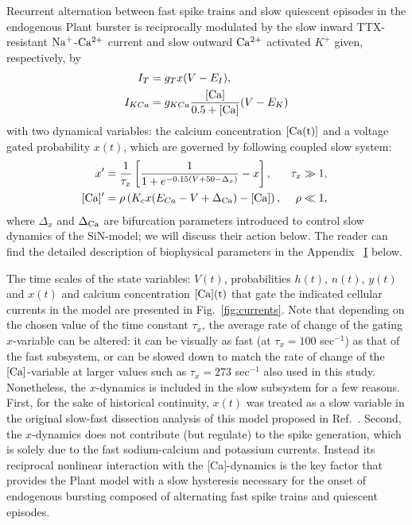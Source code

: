 \documentclass[nofootinbib,aip,amsmath,amssymb,reprint,twocolumn,10pt]{revtex4-2}
\begin{document}
Recurrent alternation between fast spike trains and slow quiescent episodes in the endogenous Plant burster is reciprocally modulated by the slow inward TTX-resistant $\rm Na^{+}$-$\rm Ca^{2+}$ current and slow outward $\rm Ca^{2+}$ activated $K^+$ given, respectively, by 
%
\begin{align} 
I_{T} &= g_{T} x (V-E_{I}), \label{eq:ttxcurrent} \\
I_{KCa} &= g_{KCa}\frac{[\rm Ca]}{0.5+[\rm Ca]}(V-E_{K}) \label{eq:cacurrent} 
\end{align}
with two dynamical variables: the calcium concentration $[\rm Ca(t)]$ and a voltage gated probability $x(t)$, which are governed by following coupled slow system:  
%
\begin{align}
x^\prime &= \frac{1}{\tau_x}\left [ \frac{1}{1+e^{-0.15(V+50- \Delta_{x})}}-x \right ], &\tau_x &\gg 1, \label{SlowSub1} ~\\
[\rm Ca]^\prime  &=  \rho \left ( K_{c} x (E_{Ca}-V + \Delta_{\rm Ca})-[\rm Ca] \right  ), &\rho &\ll 1,  \label{SlowSub2}  
\end{align}
where $\Delta_x$ and $\Delta_{\rm Ca}$ are bifurcation parameters introduced to control slow dynamics of the SiN-model; we will discuss their action below. The reader can find the detailed description of biophysical parameters in the Appendix ~\hyperref[sec:appendix1]{I} below.

The time scales of the state variables: $V(t)$, probabilities $h(t)$, $n(t)$, $y(t)$ and $x(t)$ and calcium concentration $[\rm Ca](t)$ that gate the indicated cellular currents in the model are presented in Fig.~\ref{fig:currents}. Note that depending on the chosen value of the time constant $\tau_x$, the average rate of change of the gating $x$-variable can be altered: it  can be visually as fast (at $\tau_x=100$ sec$^{-1}$) as that of the fast subsystem, or can be slowed down to match the rate of change of the $[\rm Ca]$-variable at larger values such as $\tau_x=273$ sec$^{-1}$ also used in this study. Nonetheless, the $x$-dynamics is included in the slow subsystem for a few reasons. First, for the sake of historical continuity, $x(t)$ was treated as a slow variable in the original slow-fast dissection analysis of this model proposed in Ref.~\cite{RL87}. Second, the $x$-dynamics does not contribute (but regulate) to the spike generation, which is solely due to the fast sodium-calcium and potassium currents. Instead its reciprocal nonlinear interaction with the [\rm Ca]-dynamics is the key factor that provides the Plant model with a slow hysteresis necessary for the onset of endogenous bursting composed of alternating fast spike trains and quiescent episodes. 
\end{document}
